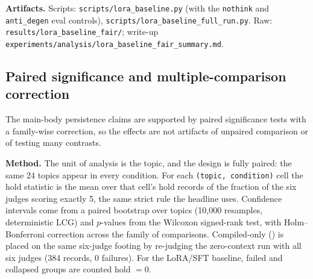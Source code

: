 \textbf{Artifacts.} Scripts: \texttt{scripts/lora\_baseline.py} (with the \texttt{nothink} and
\texttt{anti\_degen} eval controls), \texttt{scripts/lora\_baseline\_full\_run.py}. Raw:
\texttt{results/lora\_baseline\_fair/}; write-up
\texttt{experiments/analysis/lora\_baseline\_fair\_summary.md}.

\subsection{Paired significance and multiple-comparison correction}
\label{app:significance}

The main-body persistence claims are supported by paired significance tests with a
family-wise correction, so the effects are not artifacts of unpaired comparison or of
testing many contrasts.

\textbf{Method.} The unit of analysis is the topic, and the design is fully paired: the
same 24 topics appear in every condition. For each \texttt{(topic, condition)} cell the
hold statistic is the mean over that cell's hold records of the fraction of the six judges
scoring exactly 5, the same strict rule the headline uses. Confidence intervals come from a
paired bootstrap over topics (10{,}000
resamples, deterministic LCG) and $p$-values from the Wilcoxon signed-rank test, with
Holm--Bonferroni correction across the family of comparisons. Compiled-only (\condC{}) is
placed on the same six-judge footing by re-judging the  zero-context
run with all six judges (384 records, 0 failures). For the LoRA/SFT baseline, failed and
collapsed groups are counted hold $=0$.

